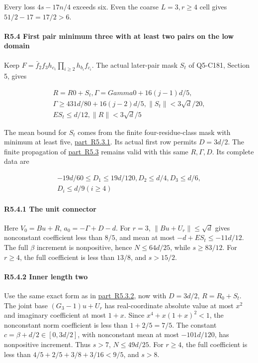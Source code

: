Every loss \(4s-17n/4\) exceeds six. Even the coarse \(L=3,\allowbreak \allowbreak  r\ge4\) cell gives \(51/2-17=17/2>6\).

\paragraph{R5.4 First pair minimum three with at least two pairs on the low domain}

Keep \(F=\bar f_2f_3h_{c_1}\prod_{i\ge2}h_{b_i}f_{c_i}\). The actual later-pair mask \(S_t\) of Q5-C181, Section 5, gives

\[
\begin{gathered}
R=R0+S_t,\Gamma=Gamma0+16(j-1)d/5,\\
\Gamma\ge 431d/80+16(j-2)d/5,\|S_t\|<3\sqrt{d}/20,\\
ES_t\le d/12,\|R\|<3\sqrt{d}/5
\end{gathered}
\]

The mean bound for \(S_t\) comes from the finite four-residue-class mask with minimum at least five, \mbox{\hyperref[part:R5.3.1]{part R5.3.1}}. Its actual first row permits \(D=3d/2\). The finite propagation of \mbox{\hyperref[part:R5.3]{part R5.3}} remains valid with this same \(R,\allowbreak \allowbreak  \Gamma,\allowbreak \allowbreak  D\). Its complete data are

\[
\begin{gathered}
-19d/60\le D_1\le 19d/120,D_2\le d/4,D_3\le d/6,\\
D_i\le d/9(i\ge 4) 
\end{gathered}\tag{R5.4.1}
\]

\paragraph{R5.4.1 The unit connector}

Here \(V_0=Bu+R\), \(a_0=-\Gamma+D-d\). For \(r=3\), \(\|Bu+U_r\|\le\sqrt d\) gives nonconstant coefficient less than \(8/5\), and mean at most \(-d+ES_t\le-11d/12\). The full \(\beta\) increment is nonpositive, hence \(N\le64d/25\), while \(s\ge83/12\). For \(r\ge4\), the full coefficient is less than \(13/8\), and \(s>15/2\).

\paragraph{R5.4.2 Inner length two}

Use the same exact form as in \mbox{\hyperref[part:R5.3.2]{part R5.3.2}}, now with \(D=3d/2\), \(R=R_0+S_t\). The joint base \((G_3-1)u+U_r\) has real-coordinate absolute value at most \(x^2\) and imaginary coefficient at most \(1+x\). Since \(x^4+x(1+x)^2<1\), the nonconstant norm coefficient is less than \(1+2/5=7/5\). The constant \(c=\beta+d/2\in[0,\allowbreak \allowbreak  3d/2]\), with nonconstant mean at most \(-101d/120\), has nonpositive increment. Thus \(s>7\), \(N\le49d/25\). For \(r\ge4\), the full coefficient is less than \(4/5+2/5+3/8+3/16<9/5\), and \(s>8\).

